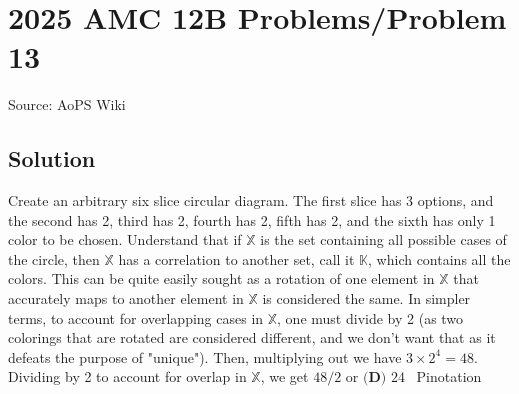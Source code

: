 \documentclass[12pt]{article}
\begin{document}
\section*{{2025 AMC 12B Problems/Problem 13}}
Source: AoPS Wiki

\subsection*{Solution}
Create an arbitrary six slice circular diagram. The first slice has 3 options, and the second has 2, third has 2, fourth has 2, fifth has 2, and the sixth has only 1 color to be chosen. Understand that if \( \mathbb{X} \) is the set containing all possible cases of the circle, then \( \mathbb{X} \) has a correlation to another set, call it \( \mathbb{K} \), which contains all the colors. This can be quite easily sought as a rotation of one element in \( \mathbb{X} \) that accurately maps to another element in \( \mathbb{X} \) is considered the same. In simpler terms, to account for overlapping cases in \( \mathbb{X} \), one must divide by 2 (as two colorings that are rotated are considered different, and we don't want that as it defeats the purpose of "unique"). Then, multiplying out we have \( 3 \times 2^4 = 48 \). Dividing by 2 to account for overlap in \( \mathbb{X} \), we get \( 48/2 \) or $\boxed{\textbf{(D) } 24}$ ~Pinotation
\end{document}
